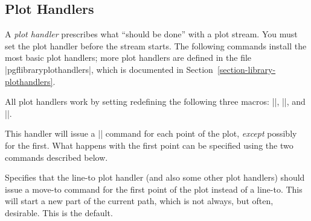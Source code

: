 


\subsection{Plot Handlers}

\label{section-plot-handlers}

A \emph{plot handler}  prescribes what ``should be done'' with a
plot stream. You must set the plot handler before the stream starts.
The following commands install the most basic plot handlers; more plot
handlers are defined in the file |pgflibraryplothandlers|, which is
documented in Section~\ref{section-library-plothandlers}.

All plot handlers work by setting redefining the following three
macros: |\pgf@plotstreamstart|, |\pgf@plotstreampoint|, and
|\pgf@plotstreamend|.

\begin{command}{\pgfplothandlerlineto}
  This handler will issue a |\pgfpathlineto| command for each point of
  the plot, \emph{except} possibly for the first. What happens with
  the first point can be specified using the two commands described
  below.

\begin{codeexample}[]
\begin{pgfpicture}
  \pgfpathmoveto{\pgfpointorigin}
  \pgfplothandlerlineto
  \pgfplotstreamstart
  \pgfplotstreampoint{\pgfpoint{1cm}{0cm}}
  \pgfplotstreampoint{\pgfpoint{2cm}{1cm}}
  \pgfplotstreampoint{\pgfpoint{3cm}{2cm}}
  \pgfplotstreampoint{\pgfpoint{1cm}{2cm}}
  \pgfplotstreamend
\end{pgfpicture}
\end{codeexample}
\end{command}

\begin{command}{\pgfsetmovetofirstplotpoint}
  Specifies that the line-to plot handler (and also some other plot 
  handlers) should issue a move-to command for the
  first point of the plot instead of a line-to. This will start a new
  part of the current path, which is not always, but often,
  desirable. This is the default.
\end{command}


